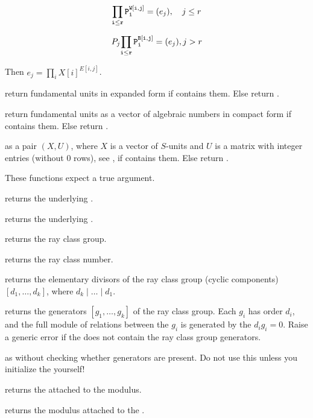 $${\tt \prod_{i \leq r} P_i^{W[i,j]}} = (e_j),\quad j \leq r$$

$$ P_j {\tt \prod_{i \leq r} P_i^{B[i,j]}} = (e_j), j > r$$

\noindent Then $e_j = \prod_i X[i]^{E[i,j]}$.

 return fundamental units in expanded form if
 contains them. Else return .

 return fundamental units as a vector
of algebraic numbers in compact form if  contains them. Else return
.

 as a pair $(X,U)$, where $X$ is a
vector of $S$-units and $U$ is a matrix with integer entries (without $0$
rows), see , if  contains them. Else return
.


These functions expect a true  argument.

 returns the underlying .

 returns the underlying .

 returns the ray class group.

 returns the ray class number.

 returns the elementary divisors
of the ray class group (cyclic components) $[d_1,\ldots, d_k]$, where
$d_k \mid \ldots \mid d_1$.

 returns the generators $[g_1,\ldots,g_k]$ of
the ray class group. Each $g_i$ has order $d_i$, and the full module of
relations between the $g_i$ is generated by the $d_ig_i = 0$. Raise
a generic error if the  does not contain the ray class group
generators.

 as  without
checking whether generators are present. Do not use this unless
you initialize the  yourself!

 returns the  attached
to the  modulus.

 returns the modulus attached
to the .


